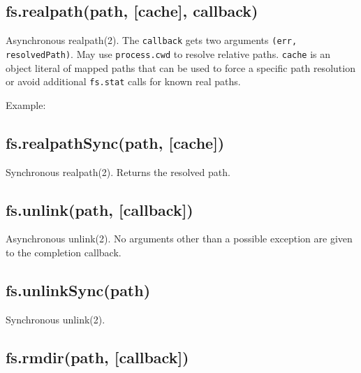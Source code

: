 \subsection{fs.realpath(path, {[}cache{]}, callback)}

Asynchronous realpath(2). The \texttt{callback} gets two arguments
\texttt{(err, resolvedPath)}. May use \texttt{process.cwd} to resolve
relative paths. \texttt{cache} is an object literal of mapped paths that
can be used to force a specific path resolution or avoid additional
\texttt{fs.stat} calls for known real paths.

Example:

\begin{Shaded}
\begin{Highlighting}[]
 \NormalTok{:}\NormalTok{\};}
\NormalTok{(} 
    
\NormalTok{\});}
\end{Highlighting}
\end{Shaded}

\subsection{fs.realpathSync(path, {[}cache{]})}

Synchronous realpath(2). Returns the resolved path.

\subsection{fs.unlink(path, {[}callback{]})}

Asynchronous unlink(2). No arguments other than a possible exception are
given to the completion callback.

\subsection{fs.unlinkSync(path)}

Synchronous unlink(2).

\subsection{fs.rmdir(path, {[}callback{]})}


